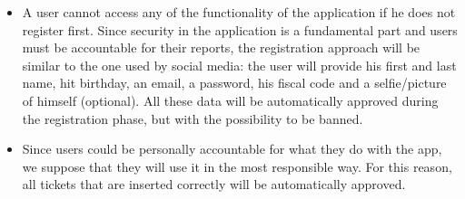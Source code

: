 \begin{itemize}
    \item A user cannot access any of the functionality of the application if he does not register first.
        Since security in the application is a fundamental part and users must be accountable for their reports,
        the registration approach will be similar to the one used by social media: the user will provide his first and last name, hit birthday, an email, a password, his fiscal code and a selfie/picture of himself (optional).
        All these data will be automatically approved during the registration phase, but with the possibility to be banned.
    \item Since users could be personally accountable for what they do with the app, we suppose that they will use it
        in the most responsible way. For this reason, all tickets that are inserted correctly will be automatically approved.
\end{itemize}
